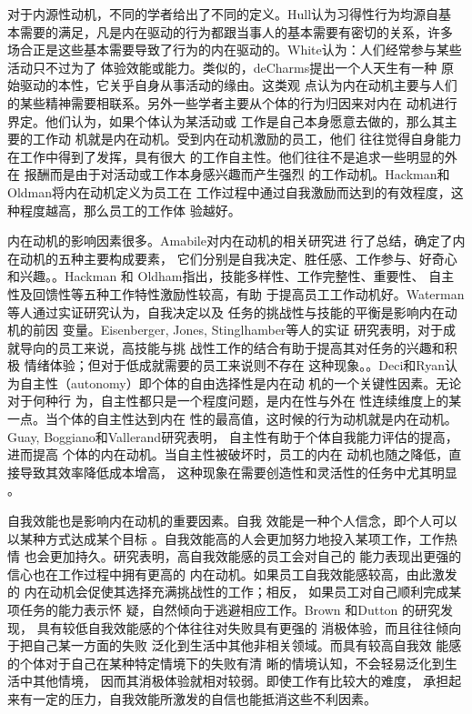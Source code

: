 \documentclass[12pt,a4paper]{ctexart}
\begin{document}
对于内源性动机，不同的学者给出了不同的定义。Hull认为习得性行为均源自基
本需要的满足，凡是内在驱动的行为都跟当事人的基本需要有密切的关系，许多
场合正是这些基本需要导致了行为的内在驱动的\cite{hull1943pbi}。White认为：人们经常参与某些活动只不过为了
体验效能或能力\cite{white66wmr}。类似的，deCharms提出一个人天生有一种
原始驱动的本性，它关乎自身从事活动的缘由\cite{decharms1968pci}。这类观
点认为内在动机主要与人们的某些精神需要相联系\cite{Kanfer1990}。另外一些学者主要从个体的行为归因来对内在
动机进行界定。他们认为，如果个体认为某活动或
工作是自己本身愿意去做的，那么其主要的工作动
机就是内在动机。受到内在动机激励的员工，他们
往往觉得自身能力在工作中得到了发挥，具有很大
的工作自主性。他们往往不是追求一些明显的外在
报酬而是由于对活动或工作本身感兴趣而产生强烈
的工作动机\cite{chenandwu2008}。Hackman和Oldman将内在动机定义为员工在
工作过程中通过自我激励而达到的有效程度，这种程度越高，那么员工的工作体
验越好\cite{hackman1975djd}。

内在动机的影响因素很多。Amabile对内在动机的相关研究进
行了总结，确定了内在动机的五种主要构成要素，
它们分别是自我决定、胜任感、工作参与、好奇心
和兴趣\cite{amabile1996cc}。。Hackman 和
Oldham指出，技能多样性、工作完整性、重要性、
自主性及回馈性等五种工作特性激励性较高，有助
于提高员工工作动机好\cite{hackman1975djd}。Waterman等人通过实证研究认为，自我决定以及
任务的挑战性与技能的平衡是影响内在动机的前因
变量\cite{AlanSWaterman11012003}。Eisenberger, Jones, Stinglhamber等人的实证
研究表明，对于成就导向的员工来说，高技能与挑
战性工作的结合有助于提高其对任务的兴趣和积极
情绪体验；但对于低成就需要的员工来说则不存在
这种现象\cite{Eisenberger2005}。。Deci和Ryan认为自主性（autonomy）即个体的自由选择性是内在动
机的一个关键性因素。无论对于何种行
为，自主性都只是一个程度问题，是内在性与外在
性连续维度上的某一点。当个体的自主性达到内在
性的最高值，这时候的行为动机就是内在动机\cite{ryan2000sdt}。Guay, Boggiano和Vallerand研究表明，
自主性有助于个体自我能力评估的提高，进而提高
个体的内在动机。当自主性被破坏时，员工的内在
动机也随之降低，直接导致其效率降低成本增高，
这种现象在需要创造性和灵活性的任务中尤其明显
\cite{FredericGuay06012001}。

自我效能也是影响内在动机的重要因素。自我
效能是一种个人信念，即个人可以以某种方式达成某个目标
\cite{ormrod2003epd}。自我效能高的人会更加努力地投入某项工作，工作热情
也会更加持久\cite{schunk1990gsa}。研究表明，高自我效能感的员工会对自己的
能力表现出更强的信心也在工作过程中拥有更高的
内在动机。如果员工自我效能感较高，由此激发的
内在动机会促使其选择充满挑战性的工作；相反，
如果员工对自己顺利完成某项任务的能力表示怀
疑，自然倾向于逃避相应工作\cite{David2007}\cite{bandura2003nse}。Brown 和Dutton 的研究发现，
具有较低自我效能感的个体往往对失败具有更强的
消极体验，而且往往倾向于把自己某一方面的失败
泛化到生活中其他非相关领域。而具有较高自我效
能感的个体对于自己在某种特定情境下的失败有清
晰的情境认知，不会轻易泛化到生活中其他情境，
因而其消极体验就相对较弱\cite{brown1995tvc}。即使工作有比较大的难度，
承担起来有一定的压力，自我效能所激发的自信也能抵消这些不利因素。
\end{document}
